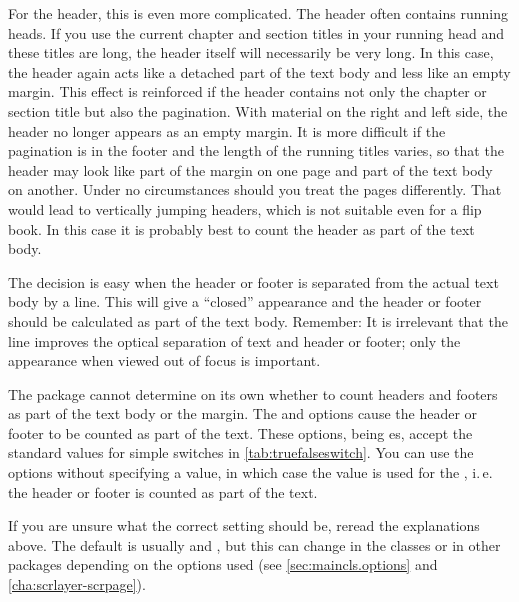 \begin{Explain}
  For the header, this is even more complicated. The header often contains
  running heads. %
  \iffalse%
  \unskip\footnote{Running heads refer to the repetition of a title, in
    titling font, which usually appears in the page header, or rarely in the
    page footer.} %
  \fi If you use the current chapter and section titles in your running head
  and these titles are long, the header itself will necessarily be very
  long. In this case, the header again acts like a detached part of the text
  body and less like an empty margin. This effect is reinforced if the header
  contains not only the chapter or section title but also the pagination. With
  material on the right and left side, the header no longer appears as an
  empty margin. It is more difficult if the pagination is in the footer and
  the length of the running titles varies, so that the header may look like
  part of the margin on one page and part of the text body on another. Under
  no circumstances should you treat the pages differently. That would lead to
  vertically jumping headers, which is not suitable even for a flip book. In
  this case it is probably best to count the header as part of the text body.

  The decision is easy when the header or footer is separated from the actual
  text body by a line. This will give a ``closed'' appearance and the header
  or footer should be calculated as part of the text body.  Remember: It is
  irrelevant that the line improves the optical separation of text and header
  or footer; only the appearance when viewed out of focus is important.
\end{Explain}

The  package cannot determine on its own whether
to count headers and footers as part of the text body or the
margin. The  and  options cause
the header or footer to be counted as part of the text.  These
options, being es,
accept the standard values for simple switches in
\autoref{tab:truefalseswitch}. You can use the options without
specifying a value, in which case the value  is used for
the , i.\,e. the header or footer is counted as part of
the text.

If you are unsure what the correct setting should be, reread the explanations
above. The default is usually  and
, but this can change in the {\KOMAScript}
classes or in other {\KOMAScript} packages depending on the options used (see
\autoref{sec:maincls.options} and \autoref{cha:scrlayer-scrpage}).

